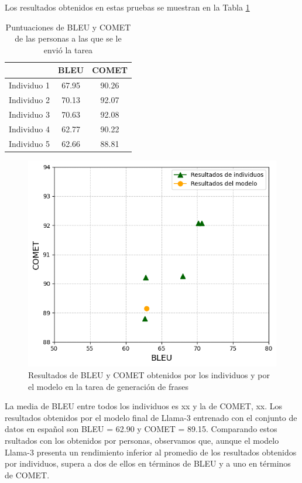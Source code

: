 \documentclass[11pt,spanish,listoffigures,listoftables]{tfgetsinf}
\begin{document}
Los resultados obtenidos en estas pruebas se muestran en la Tabla \ref{tab:experimentosPersonas}
\begin{table}[!h]
\caption{Puntuaciones de BLEU y COMET de las personas a las que se le envió la tarea}
\begin{center}
\begin{tabular}{ c | c c }
	\ & BLEU & COMET \\
	\hline
	\hline
	Individuo 1 & 67.95 & 90.26  \\
	Individuo 2 & 70.13 & 92.07\\
	Individuo 3 & 70.63 & 92.08 \\
	Individuo 4 & 62.77 & 90.22 \\
	Individuo 5 & 62.66 & 88.81 \\

\end{tabular}
\end{center}
\label{tab:experimentosPersonas}
\end{table}

\begin{figure}[h]
\includegraphics[scale = 0.8]{images/comparacion_individuos.png}
\centering
\caption{Resultados de BLEU y COMET obtenidos por los individuos y por el modelo en la tarea de generación de frases}
\label{fig:comparacionIndividuos}
\end{figure}

La media de BLEU entre todos los individuos es xx y la de COMET, xx. Los resultados obtenidos por el modelo final de Llama-3 entrenado con el conjunto de datos en español son BLEU = 62.90 y COMET = 89.15. Comparando estos rsultados con los obtenidos por personas, observamos que, aunque el modelo Llama-3 presenta un rendimiento inferior al promedio de los resultados obtenidos por individuos, supera a dos de ellos en términos de BLEU y a uno en términos de COMET.
\end{document}
